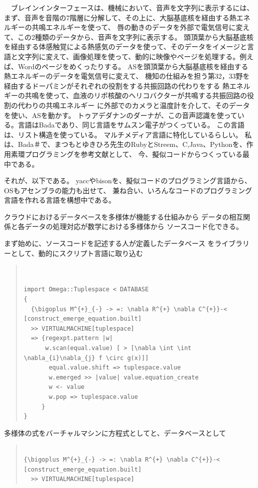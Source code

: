 \documentclass{jsarticle}
\begin{document}
　ブレインインターフェースは、機械において、音声を文字列に表示するには、
まず、音声を音階の7階層に分解して、その上に、大脳基底核を経由する熱エネルギーの共鳴エネルギーを使って、
唇の動きのデータを外部で電気信号に変えて、この2種類のデータから、音声を文字列に表示する。
頭頂葉から大脳基底核を経由する体感触覚による熱感気のデータを使って、そのデータをイメージと言語と文字列に変えて、画像処理を使って、動的に映像やページを処理する。例えば、Wordのページをめくったりする。
ASを頭頂葉から大脳基底核を経由する熱エネルギーのデータを電気信号に変えて、
機知の仕組みを担う第32，33野を経由するドーパミンがそれぞれの役割をする共振回路の代わりをする
熱エネルギーの共鳴を使って、血液のリボ核酸のヘリコバクターが共鳴する共振回路の役割の代わりの共鳴エネルギー
に外部でのカメラと温度計を介して、そのデータを使い、ASを動かす。
トゥアデダナンのダーナが、この音声認識を使っている。言語はBadaであり、同じ言語をサムスン電子がつくっている。
この言語は、リスト構造を使っている。
マルチメディア言語に特化しているらしい。
私は、Bada＃で、まつもとゆきひろ先生のRubyとStreem、C,Java、Pythonを、作用素環プログラミングを参考文献として、
今、擬似コードからつくっている最中である。

  それが、以下である。
  yaccやbisonを、擬似コードのプログラミング言語から、OSもアセンブラの能力も出せて、
  兼ね合い、いろんなコードのプログラミング言語を作れる言語を構想中である。

 クラウドにおけるデータベースを多様体が機能する仕組みから
 データの相互関係と各データの処理対応が数学における多様体から
 ソースコード化できる。


 まず始めに、ソースコードを記述する人が定義したデータベース
 をライブラリーとして、動的にスクリプト言語に取り込む


\begin{quote}
\setlength{\baselineskip}{12pt}
\begin{verbatim}


import Omega::Tuplespace < DATABASE
{
  {\bigoplus M^{+}_{-} -> =: \nabla R^{+} \nabla C^{+}}-< [construct_emerge_equation.built]
  >> VIRTUALMACHINE[tuplespace]
  => {regexpt.pattern |w|
      w.scan(equal.value) [ > [\nabla \int \int \nabla_{i}\nabla_{j} f \circ g(x)]]
       equal.value.shift => tuplespace.value
       w.emerged >> |value| value.equation_create 
       w <- value
       w.pop => tuplespace.value
     }
} 
\end{verbatim}
\end{quote}

多様体の式をバーチャルマシンに方程式としてと、データベースとして
\begin{quote}
\setlength{\baselineskip}{12pt}
\begin{verbatim}

{\bigoplus M^{+}_{-} -> =: \nabla R^{+} \nabla C^{+}}-< [construct_emerge_equation.built]
  >> VIRTUALMACHINE[tuplespace] 

\end{verbatim}
\end{quote}
\end{document}
